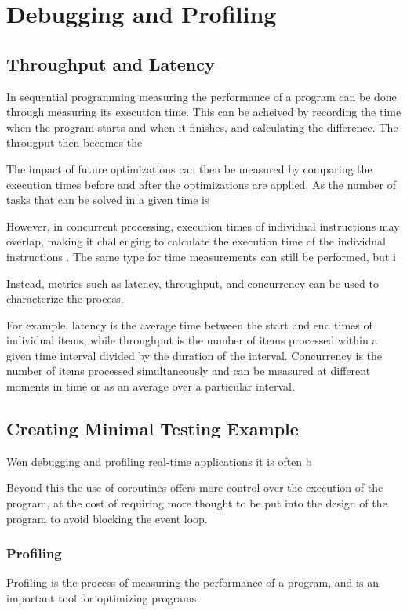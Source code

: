 
\section{Debugging and Profiling}

\subsection{Throughput and Latency}
In sequential programming measuring the performance of a program can be done through measuring its execution time.
This can be acheived by recording the time when the program starts and when it finishes, and calculating the difference.
The througput then becomes the

The impact of future optimizations can then be measured by comparing the execution times before and after the optimizations are applied.
As the number of tasks that can be solved in a given time is

However, in concurrent processing, execution times of individual instructions may overlap, making it challenging to calculate the execution time of the individual instructions \cite[21]{volkovLatencyHiding2016}.
The same type for time measurements can still be performed, but i

Instead, metrics such as latency, throughput, and concurrency can be used to characterize the process.

For example, latency is the average time between the start and end times of individual items, while throughput is the number of items processed within a given time interval divided by the duration of the interval.
Concurrency is the number of items processed simultaneously and can be measured at different moments in time or as an average over a particular interval.

\subsection{Creating Minimal Testing Example}
Wen debugging and profiling real-time applications it is often b

Beyond this the use of coroutines offers more control over the execution of the program, at the cost of requiring more thought to be put into the design of the program to avoid blocking the event loop.



\subsubsection{Profiling}
Profiling is the process of measuring the performance of a program, and is an important tool for optimizing programs.

